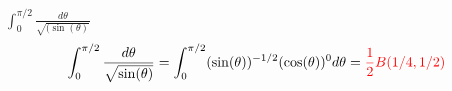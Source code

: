 \item [7.] \( \displaystyle \int_0^{\pi/2} \frac{d\theta}{\sqrt{(\sin(\theta)}}\)
\[
    \int_0^{\pi/2} \frac{d\theta}{\sqrt{\sin(\theta)}}
    =\int_0^{\pi/2} (\sin(\theta))^{-1/2}(\cos(\theta))^{0}d\theta
    = \textcolor{red}{\frac{1}{2}B(1/4,1/2)}
\]
